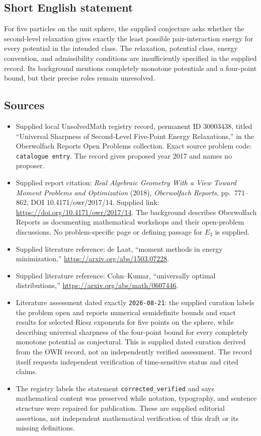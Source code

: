 \documentclass[11pt]{article}
\begin{document}
\subsection{Short English statement}
For five particles on the unit sphere, the supplied conjecture asks whether the second-level relaxation gives exactly the least possible pair-interaction energy for every potential in the intended class. The relaxation, potential class, energy convention, and admissibility conditions are insufficiently specified in the supplied record. Its background mentions completely monotone potentials and a four-point bound, but their precise roles remain unresolved.
\subsection{Sources}
\begin{itemize}
\item Supplied local UnsolvedMath registry record, permanent ID \(30003438\), titled ``Universal Sharpness of Second-Level Five-Point Energy Relaxations,'' in the Oberwolfach Reports Open Problems collection. Exact source problem code: \texttt{catalogue entry}. The record gives proposed year 2017 and names no proposer.
\item Supplied report citation: \emph{Real Algebraic Geometry With a View Toward Moment Problems and Optimization} (2018), \emph{Oberwolfach Reports}, pp.~771--862, DOI 10.4171/owr/2017/14. Supplied link: \url{https://doi.org/10.4171/owr/2017/14}. The background describes Oberwolfach Reports as documenting mathematical workshops and their open-problem discussions. No problem-specific page or defining passage for \(E_2\) is supplied.
\item Supplied literature reference: de Laat, ``moment methods in energy minimization,'' \url{https://arxiv.org/abs/1503.07228}.
\item Supplied literature reference: Cohn--Kumar, ``universally optimal distributions,'' \url{https://arxiv.org/abs/math/0607446}.
\item Literature assessment dated exactly \texttt{2026-08-21}: the supplied curation labels the problem open and reports numerical semidefinite bounds and exact results for selected Riesz exponents for five points on the sphere, while describing universal sharpness of the four-point bound for every completely monotone potential as conjectural. This is supplied dated curation derived from the OWR record, not an independently verified assessment. The record itself requests independent verification of time-sensitive status and cited claims.
\item The registry labels the statement \texttt{corrected\_verified} and says mathematical content was preserved while notation, typography, and sentence structure were repaired for publication. These are supplied editorial assertions, not independent mathematical verification of this draft or its missing definitions.
\end{itemize}
\end{document}
